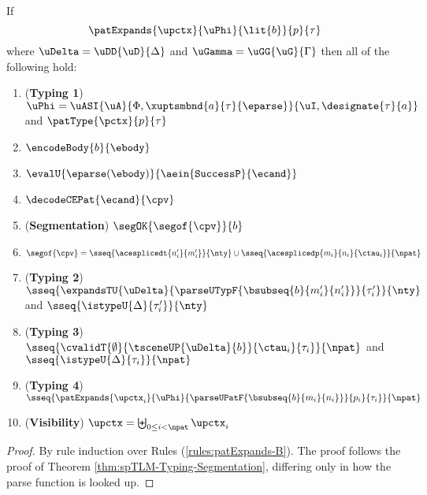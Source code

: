 \begin{theorem}
\label{thm:spTLM-Typing-Segmentation-Implicit-B}
If \[\patExpands{\upctx}{\uPhi}{\lit{b}}{p}{\tau}\] where $\uDelta=\uDD{\uD}{\Delta}$ and $\uGamma=\uGG{\uG}{\Gamma}$ then all of the following hold:
\begin{enumerate}
        \item (\textbf{Typing 1}) $\uPhi = \uASI{\uA}{\Phi, \xuptsmbnd{a}{\tau}{\eparse}}{\uI, \designate{\tau}{a}}$ and $\patType{\pctx}{p}{\tau}$
        \item $\encodeBody{b}{\ebody}$
        \item $\evalU{\eparse(\ebody)}{\aein{\mathtt{SuccessP}}{\ecand}}$
        \item $\decodeCEPat{\ecand}{\cpv}$
        \item (\textbf{Segmentation}) $\segOK{\segof{\cpv}}{b}$
        \item $\segof{\cpv} = \sseq{\acesplicedt{n'_i}{m'_i}}{\nty} \cup \sseq{\acesplicedp{m_i}{n_i}{\ctau_i}}{\npat}$
        \item (\textbf{Typing 2}) $\sseq{
              \expandsTU{\uDelta}
              {
                \parseUTypF{\bsubseq{b}{m'_i}{n'_i}}
              }{\tau'_i}
            }{\nty}$ and $\sseq{\istypeU{\Delta}{\tau'_i}}{\nty}$
        \item (\textbf{Typing 3}) $\sseq{
          \cvalidT{\emptyset}{
            \tsceneUP
              {\uDelta}{b}
          }{
            \ctau_i
          }{\tau_i}
        }{\npat}$ and $\sseq{\istypeU{\Delta}{\tau_i}}{\npat}$
        \item (\textbf{Typing 4}) $\sseq{
          \patExpands
            {\upctx_i}
            {\uPhi}
            {\parseUPatF{\bsubseq{b}{m_i}{n_i}}}
            {p_i}
            {\tau_i}
        }{\npat}$ 
      \item (\textbf{Visibility}) $\upctx = \biguplus_{0 \leq i < \npat} \upctx_i$
\end{enumerate}
\end{theorem}
\begin{proof} By rule induction over Rules (\ref{rules:patExpands-B}). The proof follows the proof of Theorem \ref{thm:spTLM-Typing-Segmentation}, differing only in how the parse function is looked up.
\end{proof}

